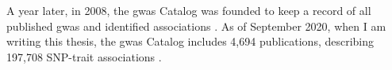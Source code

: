
A year later, in 2008, the \gls{gwas} Catalog was founded to keep a record of all published \gls{gwas} and identified associations \cite{welter2014nhgri}.
As of September 2020, when I am writing this thesis, the \gls{gwas} Catalog includes 4,694 publications, describing 197,708
SNP-trait
associations
\cite{macarthur2017new}.\\





